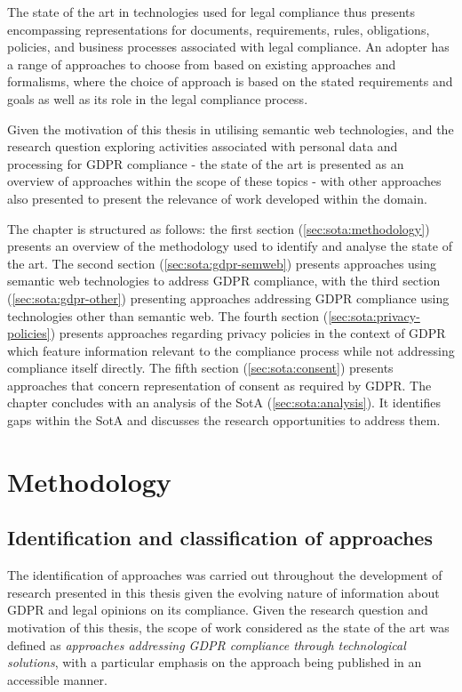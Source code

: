 The state of the art in technologies used for legal compliance thus presents encompassing representations for documents, requirements, rules, obligations, policies, and business processes associated with legal compliance. An adopter has a range of approaches to choose from based on existing approaches and formalisms, where the choice of approach is based on the stated requirements and goals as well as its role in the legal compliance process.

Given the motivation of this thesis in utilising semantic web technologies, and the research question exploring activities associated with personal data and processing for GDPR compliance - the state of the art is presented as an overview of approaches within the scope of these topics - with other approaches also presented to present the relevance of work developed within the domain.

The chapter is structured as follows: the first section (\autoref{sec:sota:methodology}) presents an overview of the methodology used to identify and analyse the state of the art. 
The second section (\autoref{sec:sota:gdpr-semweb}) presents approaches using semantic web technologies to address GDPR compliance, with the third section  (\autoref{sec:sota:gdpr-other}) presenting approaches addressing GDPR compliance using technologies other than semantic web.
The fourth section (\autoref{sec:sota:privacy-policies}) presents approaches regarding privacy policies in the context of GDPR which feature information relevant to the compliance process while not addressing compliance itself directly.
The fifth section (\autoref{sec:sota:consent}) presents approaches that concern representation of consent as required by GDPR.
The chapter concludes with an analysis of the SotA (\autoref{sec:sota:analysis}). It identifies gaps within the SotA and discusses the research opportunities to address them.

\section{Methodology}\label{sec:sota:methodology}

\subsection{Identification and classification of approaches}
The identification of approaches was carried out throughout the development of research presented in this thesis given the evolving nature of information about GDPR and legal opinions on its compliance.
Given the research question and motivation of this thesis, the scope of work considered as the state of the art was defined as \textit{approaches addressing GDPR compliance through technological solutions}, with a particular emphasis on the approach being published in an accessible manner.

